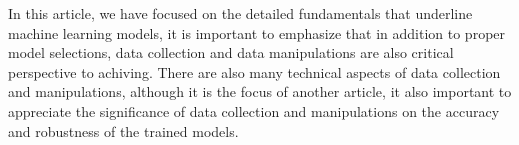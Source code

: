 
\par
In this article, we have focused on the detailed fundamentals that underline machine learning models, it is important to emphasize that in addition to proper model selections, data collection and data manipulations are also critical perspective to achiving. There are also many technical aspects of data collection and manipulations, although it is the focus of another article, it also important to appreciate the significance of data collection and manipulations on the accuracy and robustness of the trained models.
\par 
